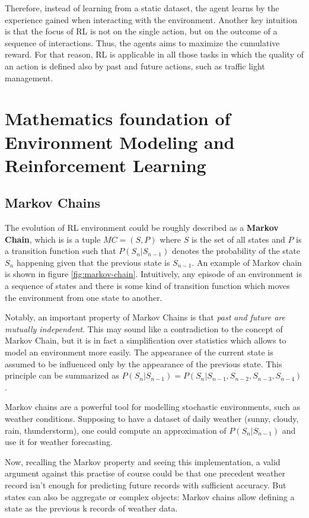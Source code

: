 Therefore, instead of learning from a static dataset, the agent learns by the experience gained when interacting with the environment.
Another key intuition is that the focus of RL is not on the single action, but on the outcome of a sequence of interactions. Thus, the agents aims to maximize the cumulative reward.
For that reason, RL is applicable in all those tasks in which the quality of an action is defined also by past and future actions, such as traffic light management.

\section{Mathematics foundation of Environment Modeling and Reinforcement Learning}

\subsection{Markov Chains}

The evolution of RL environment could be roughly described as a \textbf{Markov Chain}, which is is a tuple $MC = (S, P)$ where $S$ is the set of all states and $P$ is a transition function such that $P(S_n | S_{n-1})$ denotes the probability of the state $S_n$ happening given that the previous state is $S_{n-1}$. An example of Markov chain is shown in figure \ref{fig:markov-chain}. Intuitively, any episode of an environment is a sequence of states and there is some kind of transition function which moves the environment from one state to another.

Notably, an important property of Markov Chains is that \textit{past and future are mutually independent}. This may sound like a contradiction to the concept of Markov Chain, but it is in fact a simplification over statistics which allows to model an environment more easily. The appearance of the current state is assumed to be influenced only by the appearance of the previous state. This principle can be summarized as $P(S_n | S_{n-1}) = P(S_n | S_{n-1}, S_{n-2}, S_{n-3}, S_{n-4})$.

Markov chains are a powerful tool for modelling stochastic environments, such as weather conditions. Supposing to have a dataset of daily weather (sunny, cloudy, rain, thunderstorm), one could compute an approximation of $P(S_n | S_{n-1})$ and use it for weather forecasting.

Now, recalling the Markov property and seeing this implementation, a valid argument against this practise of course could be that one precedent weather record isn't enough for predicting future records with sufficient accuracy. But states can also be aggregate or complex objects: Markov chains allow defining a state as the previous k records of weather data.

